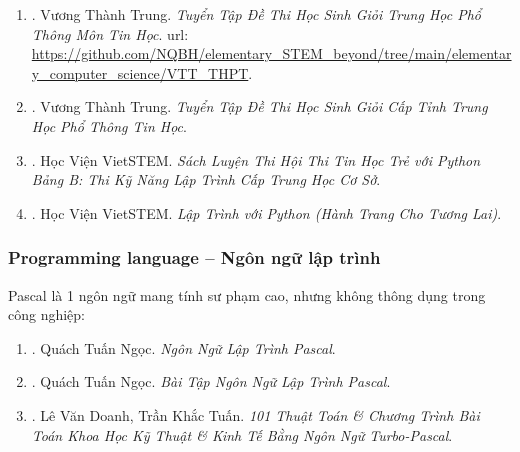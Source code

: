 \documentclass[12pt,oneside]{book}
\begin{document}
\begin{enumerate}
	{\tt Dec 8, 2024}, tôi có lên group Facebook của \href{https://www.facebook.com/groups/VNOIForum}{\it VNOI -- Diễn đàn Olympic Tin Học Việt Nam} thì thấy thông báo của thầy {\sc Hồ Đắc Phương} về việc thầy {\sc Vương Thành Trung}, giáo viên phụ trách Đội tuyển Tin của tỉnh Hòa Bình (cuối tháng 12, 2021, tôi cách ly Covid ở khu Quân sự tỉnh Hòa Bình khi từ Áo trở về Việt Nam), qua đời ngày đầu tháng 12, 2024 do bị 1 tên nghiện ma túy đâm chết. Mong thầy yên nghỉ. Di sản của thầy sẽ được các lứa học sinh chuyên Tin tiếp theo kế thừa \& tiếp tục phát triển. Đấy là điều chắc chắn.
	
	\item \cite{Trung_THPT_Tin}. {\sc Vương Thành Trung}. {\it Tuyển Tập Đề Thi Học Sinh Giỏi Trung Học Phổ Thông Môn Tin Học}. {\sc url}: \url{https://github.com/NQBH/elementary_STEM_beyond/tree/main/elementary_computer_science/VTT_THPT}.
	
	\item \cite{Trung_HSG_THPT_Tin}. {\sc Vương Thành Trung}. {\it Tuyển Tập Đề Thi Học Sinh Giỏi Cấp Tỉnh Trung Học Phổ Thông Tin Học}.
	
	\item \cite{VietSTEM2021}. {\sc Học Viện VietSTEM}. {\it Sách Luyện Thi Hội Thi Tin Học Trẻ  với Python Bảng B: Thi Kỹ Năng Lập Trình Cấp Trung Học Cơ Sở}.
	
	\item \cite{VietSTEM2022}. {\sc Học Viện VietSTEM}. {\it Lập Trình với Python (Hành Trang Cho Tương Lai)}.
\end{enumerate}

\subsubsection{Programming language -- Ngôn ngữ lập trình}
Pascal là 1 ngôn ngữ mang tính sư phạm cao, nhưng không thông dụng trong công nghiệp:

\begin{enumerate}
	\item \cite{Ngoc_Pascal}. {\sc Quách Tuấn Ngọc}. {\it Ngôn Ngữ Lập Trình Pascal}.
	
	\item \cite{Ngoc_BT_Pascal}. {\sc Quách Tuấn Ngọc}. {\it Bài Tập Ngôn Ngữ Lập Trình Pascal}.
	
	\item \cite{Doanh_Tuan_Pascal}. {\sc Lê Văn Doanh, Trần Khắc Tuấn}. {\it101 Thuật Toán \& Chương Trình Bài Toán Khoa Học Kỹ Thuật \& Kinh Tế Bằng Ngôn Ngữ Turbo-Pascal}.
\end{enumerate}
\end{document}
